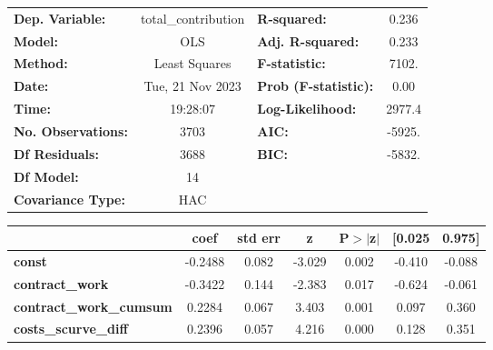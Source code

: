 \begin{center}
\begin{tabular}{lclc}
\toprule
\textbf{Dep. Variable:}                     & total\_contribution & \textbf{  R-squared:         } &     0.236   \\
\textbf{Model:}                             &         OLS         & \textbf{  Adj. R-squared:    } &     0.233   \\
\textbf{Method:}                            &    Least Squares    & \textbf{  F-statistic:       } &     7102.   \\
\textbf{Date:}                              &   Tue, 21 Nov 2023  & \textbf{  Prob (F-statistic):} &     0.00    \\
\textbf{Time:}                              &       19:28:07      & \textbf{  Log-Likelihood:    } &    2977.4   \\
\textbf{No. Observations:}                  &          3703       & \textbf{  AIC:               } &    -5925.   \\
\textbf{Df Residuals:}                      &          3688       & \textbf{  BIC:               } &    -5832.   \\
\textbf{Df Model:}                          &            14       & \textbf{                     } &             \\
\textbf{Covariance Type:}                   &         HAC         & \textbf{                     } &             \\
\bottomrule
\end{tabular}
\begin{tabular}{lcccccc}
                                            & \textbf{coef} & \textbf{std err} & \textbf{z} & \textbf{P$> |$z$|$} & \textbf{[0.025} & \textbf{0.975]}  \\
\midrule
\textbf{const}                              &      -0.2488  &        0.082     &    -3.029  &         0.002        &       -0.410    &       -0.088     \\
\textbf{contract\_work}                     &      -0.3422  &        0.144     &    -2.383  &         0.017        &       -0.624    &       -0.061     \\
\textbf{contract\_work\_cumsum}             &       0.2284  &        0.067     &     3.403  &         0.001        &        0.097    &        0.360     \\
\textbf{costs\_scurve\_diff}                &       0.2396  &        0.057     &     4.216  &         0.000        &        0.128    &        0.351     \\

\end{tabular}
\end{center}
